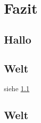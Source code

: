 \chapter{Fazit}\label{cha:Fazit}
\section{Hallo}\label{sec:Hallof}

\blindtext[20]


\section{Welt}\label{sec:Hallof2}


siehe \ref{sec:Hallof}


\blindtext[20]


\section{Welt}\label{sec:Weltf}

\blindtext[20]
